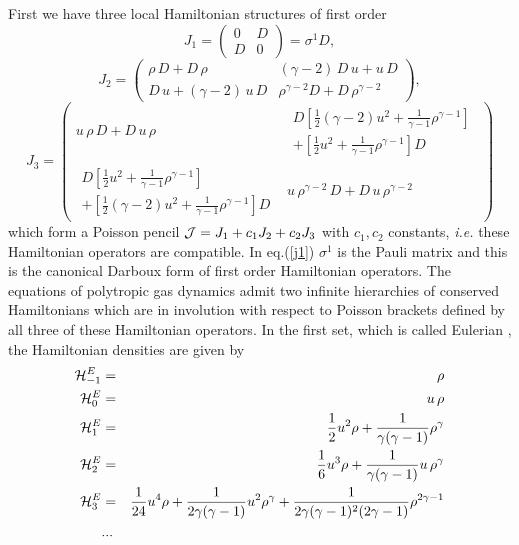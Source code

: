 \documentclass[a4paper,12pt]{article}
\begin{document}
First we have three local Hamiltonian structures of first order \cite{n1}
\begin{equation}
 J_1 = \left( \begin{array}{cc} 0 & D \\ D & 0 \end{array} \right)
= \sigma^1 D,
\label{j1}
\end{equation}
\begin{equation}
 J_2 =  \left( \begin{array}{cc}  \rho \, D  + D \, \rho &
            (\gamma-2)\,  D \, u + u \, D \\
                  D \, u + (\gamma-2)\,  u \, D   &
 \rho^{\gamma-2} D + D \, \rho^{\gamma-2}  \end{array} \right),
\label{j2}
\end{equation}
\begin{equation}
 J_3 = \left( \begin{array}{cc} u \, \rho \, D  + D \, u \, \rho &
\begin{array}{c}
D \left[ \frac{1}{2} (\gamma-2) u^2 +  \frac{1}{\gamma-1}
\rho^{\gamma-1} \right] \\ + \left[ \frac{1}{2} u^2 +
\frac{1}{\gamma-1} \rho^{\gamma-1}
\right] D \end{array} \\
\begin{array}{c}
D \left[ \frac{1}{2} u^2 +  \frac{1}{\gamma-1} \rho^{\gamma-1}
\right]  \\ + \left[
  \frac{1}{2} (\gamma-2) u^2 +  \frac{1}{\gamma-1} \rho^{\gamma-1}
\right]   D  \end{array} &
u \, \rho^{\gamma-2} \, D + D  \, u \, \rho^{\gamma-2}  \end{array} \right)
\label{j3}
\end{equation}
which form a Poisson pencil ${\cal J} = J_1 + c_1 J_2 + c_2 J_3$
with $c_1, c_2$ constants, {\it i.e.} these Hamiltonian operators
are compatible. In eq.(\ref{j1}) $\sigma^1$ is the Pauli matrix
and this is the canonical Darboux form of first order Hamiltonian
operators. The equations of polytropic gas dynamics admit two
infinite hierarchies of conserved Hamiltonians which are in
involution with respect to Poisson brackets defined by all three
of these Hamiltonian operators. In the first set, which is called
Eulerian \cite{gn1}, the Hamiltonian densities are given by
\begin{eqnarray}
{\cal H}_{-1}^E &=& \rho \label{casimir1} \\
{\cal H}_{0}^E &=& u\, \rho \label{momentum} \\
{\cal H}_{1}^E &=& \frac{1}{2} u^{2} \rho
  +\frac{1}{\gamma (\gamma -1)} \rho^{\gamma} \label{hamiltonian} \\
{\cal H}_{2}^E &=& \frac{1}{6} u^{3} \rho
+ \frac{1}{\gamma (\gamma-1)} u\, \rho^{\gamma} \label{h5}\\
{\cal H}_{3}^E &=& \frac{1}{24} u^{4} \rho
+\frac{1}{2 \gamma (\gamma -1)} u^{2} \rho^{\gamma }
+\frac{1}{2 \gamma (\gamma -1)^{2} (2\gamma -1)}
\rho^{2\gamma -1} \label{h6}\\
& ... &  \nonumber
\end{eqnarray}
\end{document}

